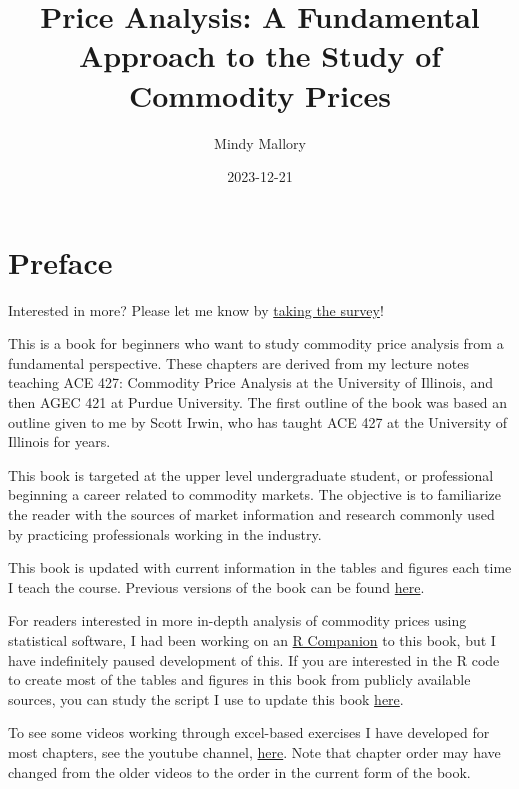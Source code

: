 \documentclass[
  letterpaper,
  DIV=11,
  numbers=noendperiod]{scrreprt}
\title{Price Analysis: A Fundamental Approach to the Study of Commodity
Prices}
\author{Mindy Mallory}
\date{2023-12-21}
\renewcommand*\contentsname{Table of contents}
\newcommand\contentsname{Table of contents}
\begin{document}
\maketitle

\renewcommand*\contentsname{Table of contents}
{
\hypersetup{linkcolor=}
\setcounter{tocdepth}{2}
\tableofcontents
}

\chapter*{Preface}\label{preface}


{Interested in more? Please let me know by}
\href{https://forms.gle/Q3VByCQZHjfQSy9D7}{taking the survey}!

This is a book for beginners who want to study commodity price analysis
from a fundamental perspective. These chapters are derived from my
lecture notes teaching ACE 427: Commodity Price Analysis at the
University of Illinois, and then AGEC 421 at Purdue University. The
first outline of the book was based an outline given to me by Scott
Irwin, who has taught ACE 427 at the University of Illinois for years.

This book is targeted at the upper level undergraduate student, or
professional beginning a career related to commodity markets. The
objective is to familiarize the reader with the sources of market
information and research commonly used by practicing professionals
working in the industry.

This book is updated with current information in the tables and figures
each time I teach the course. Previous versions of the book can be found
\href{https://github.com/mindymallory/PriceAnalysis/releases}{here}.

For readers interested in more in-depth analysis of commodity prices
using statistical software, I had been working on an
\href{http://mindymallory.github.io/R-Companion-Price-Analysis/index.html}{R
Companion} to this book, but I have indefinitely paused development of
this. If you are interested in the R code to create most of the tables
and figures in this book from publicly available sources, you can study
the script I use to update this book
\href{https://github.com/mindymallory/PriceAnalysis/blob/master/assets/make-assets.Rmd}{here}.

To see some videos working through excel-based exercises I have
developed for most chapters, see the youtube channel,
\href{https://www.youtube.com/@uiucace4277/videos}{here}. Note that
chapter order may have changed from the older videos to the order in the
current form of the book.
\end{document}
